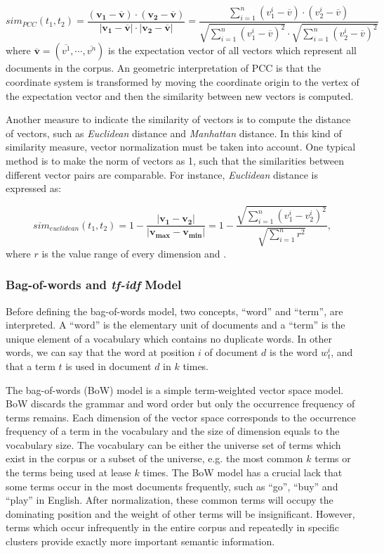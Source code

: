 \begin{equation}
    sim_{PCC}(t_1, t_2) = \frac{(\mathbf{v_1-\overline{v}}) \cdot (\mathbf{v_2-\overline{v}})}{|\mathbf{v_1-\overline{v}}| \cdot |\mathbf{v_2}-\mathbf{\overline{v}}|} = \frac{\sum_{i=1}^n (v_1^i-\overline{v}) \cdot (v_2^i-\overline{v})}{\sqrt{\sum_{i=1}^n (v_1^i-\overline{v})^2} \cdot \sqrt{\sum_{i=1}^n (v_2^i-\overline{v})^2}}
\end{equation}
where $\mathbf{\overline{v}}=(\overline{v^1}, \cdots, \overline{v^n})$ is the expectation vector of all vectors which represent all documents in the corpus. An geometric interpretation of PCC is that the coordinate system is transformed by moving the coordinate origin to the vertex of the expectation vector and then the similarity between new vectors is computed. 

Another measure to indicate the similarity of vectors is to compute the distance of vectors, such as \textit{Euclidean} distance and \textit{Manhattan} distance. In this kind of similarity measure, vector normalization must be taken into account. One typical method is to make the norm of vectors as 1, such that the similarities between different vector pairs are comparable. For instance, \textit{Euclidean} distance is expressed as: 

\begin{equation}
    sim_{euclidean}(t_1, t_2) = 1 - \frac{|\mathbf{v_1 - v_2}|}{|\mathbf{v_{max} - v_{min}}|} = 1 - \frac{\sqrt{\sum_{i=1}^n (v_1^i-v_2^i)^2}}{\sqrt{\sum_{i=1}^n r^2}} ,
\end{equation}
where $r$ is the value range of every dimension and . 

\subsubsection{Bag-of-words and \textit{tf-idf} Model}

Before defining the bag-of-words model, two concepts, ``word'' and ``term'', are interpreted. A ``word'' is the elementary unit of documents and a ``term'' is the unique element of a vocabulary which contains no duplicate words. 
In other words, we can say that the word at position $i$ of document $d$ is the word $w_t^i$, and that a term $t$ is used in document $d$ in $k$ times. 

The bag-of-words (BoW) model is a simple term-weighted vector space model. BoW discards the grammar and word order but only the occurrence frequency of terms remains. Each dimension of the vector space corresponds to the occurrence frequency of a term in the vocabulary and the size of dimension equals to the vocabulary size. The vocabulary can be either the universe set of terms which exist in the corpus or a subset of the universe, e.g. the most common $k$ terms or the terms being used at lease $k$ times. The BoW model has a crucial lack that some terms occur in the most documents frequently, such as ``go'', ``buy'' and ``play'' in English. After normalization, these common terms will occupy the dominating position and the weight of other terms will be insignificant. However, terms which occur infrequently in the entire corpus and repeatedly in specific clusters provide exactly more important semantic information. 

